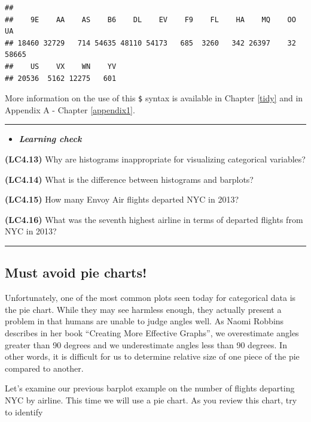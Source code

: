 \documentclass[]{tufte-book}
\newenvironment{rmdblock}[1]
  {\begin{shaded*}
  \begin{itemize}
  \renewcommand{\labelitemi}{
    \raisebox{-.7\height}[0pt][0pt]{
    }
  }
  \item
  }
  {
  \end{itemize}
  \end{shaded*}
  }
\newenvironment{learncheck}
  {\begin{rmdblock}{warning}}
  {\end{rmdblock}}
\begin{document}
\begin{verbatim}
## 
##    9E    AA    AS    B6    DL    EV    F9    FL    HA    MQ    OO    UA 
## 18460 32729   714 54635 48110 54173   685  3260   342 26397    32 58665 
##    US    VX    WN    YV 
## 20536  5162 12275   601
\end{verbatim}

More information on the use of this \texttt{\$} syntax is available in
Chapter \ref{tidy} and in Appendix A - Chapter \ref{appendix1}.

\begin{center}\rule{0.5\linewidth}{\linethickness}\end{center}

\begin{learncheck}
\textbf{\emph{Learning check}}
\end{learncheck}

\textbf{(LC4.13)} Why are histograms inappropriate for visualizing
categorical variables?

\textbf{(LC4.14)} What is the difference between histograms and
barplots?

\textbf{(LC4.15)} How many Envoy Air flights departed NYC in 2013?

\textbf{(LC4.16)} What was the seventh highest airline in terms of
departed flights from NYC in 2013?

\begin{center}\rule{0.5\linewidth}{\linethickness}\end{center}

\subsection{Must avoid pie charts!}\label{must-avoid-pie-charts}

Unfortunately, one of the most common plots seen today for categorical
data is the pie chart. While they may see harmless enough, they actually
present a problem in that humans are unable to judge angles well. As
Naomi Robbins describes in her book ``Creating More Effective Graphs'',
we overestimate angles greater than 90 degrees and we underestimate
angles less than 90 degrees. In other words, it is difficult for us to
determine relative size of one piece of the pie compared to another.

Let's examine our previous barplot example on the number of flights
departing NYC by airline. This time we will use a pie chart. As you
review this chart, try to identify
\end{document}
